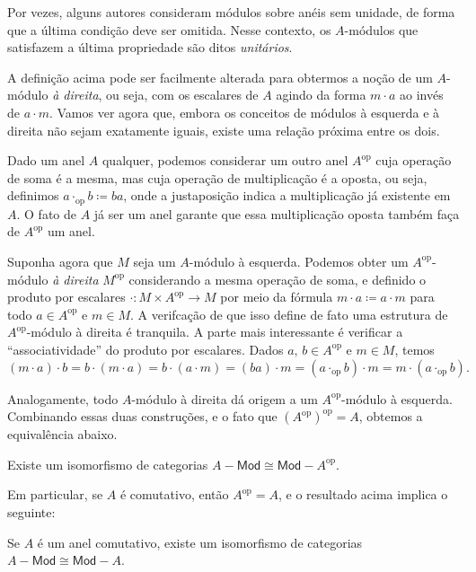 Por vezes, alguns autores consideram módulos sobre anéis sem unidade, de forma que a última condição deve ser omitida.
Nesse contexto, os $A$-módulos que satisfazem a última propriedade são ditos \emph{unitários}.

A definição acima pode ser facilmente alterada para obtermos a noção de um $A$-módulo \emph{à direita}, ou seja, com os escalares de $A$ agindo da forma $m \cdot a$ ao invés de $a \cdot m$.
Vamos ver agora que, embora os conceitos de módulos à esquerda e à direita não sejam exatamente iguais, existe uma relação próxima entre os dois.

Dado um anel $A$ qualquer, podemos considerar um outro anel $A^{\mathrm{op}}$ cuja operação de soma é a mesma, mas cuja operação de multiplicação é a oposta, ou seja, definimos $a \cdot_{\mathrm{op}} b \coloneqq ba$, onde a justaposição indica a multiplicação já existente em $A$.
O fato de $A$ já ser um anel garante que essa multiplicação oposta também faça de $A^{\mathrm{op}}$ um anel.

Suponha agora que $M$ seja um $A$-módulo à esquerda.
Podemos obter um $A^{\mathrm{op}}$-módulo \emph{à direita} $M^{\mathrm{op}}$ considerando a mesma operação de soma, e definido o produto por escalares $\cdot: M \times A^{\mathrm{op}} \to M$ por meio da fórmula $m \cdot a \coloneqq a \cdot m$ para todo $a \in A^{\mathrm{op}}$ e $m \in M$.
A verifcação de que isso define de fato uma estrutura de $A^{\mathrm{op}}$-módulo à direita é tranquila.
A parte mais interessante é verificar a ``associatividade'' do produto por escalares.
Dados $a,\,b \in A^{\mathrm{op}}$ e $m \in M$, temos
\begin{displaymath}
  (m \cdot a) \cdot b = b \cdot (m \cdot a) = b \cdot (a \cdot m) = (ba) \cdot m = (a \cdot_{\mathrm{op}} b) \cdot m = m \cdot (a \cdot_{\mathrm{op}} b).
\end{displaymath}

Analogamente, todo $A$-módulo à direita dá origem a um $A^{\mathrm{op}}$-módulo à esquerda.
Combinando essas duas construções, e o fato que $(A^{\mathrm{op}})^{\mathrm{op}} = A$, obtemos a equivalência abaixo.

\begin{prop}
  Existe um isomorfismo de categorias $A-\mathsf{Mod} \cong \mathsf{Mod}-A^{\mathrm{op}}$.
\end{prop}

Em particular, se $A$ é comutativo, então $A^{\mathrm{op}} = A$, e o resultado acima implica o seguinte:

\begin{corol}
  Se $A$ é um anel comutativo, existe um isomorfismo de categorias $A-\mathsf{Mod} \cong \mathsf{Mod}-A$.
\end{corol}

